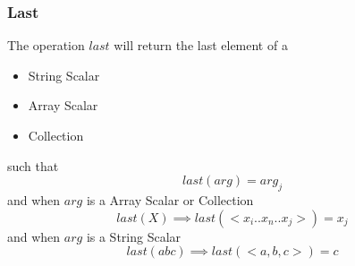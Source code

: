 \documentclass[../main.tex]{subfiles}
\begin{document}
\subsubsection{Last}
The operation $last$ will return the last element of a
\begin{itemize}
\item String Scalar
\item Array Scalar
\item Collection
\end{itemize}
such that
$$last(arg) = arg_{j}$$
and when $arg$ is a Array Scalar or Collection
$$last(X) \implies last(<x_{i}..x_{n}..x_{j}>) = x_{j}$$
and when $arg$ is a String Scalar
$$last(abc) \implies last(<a, b, c>) = c$$
\end{document}
